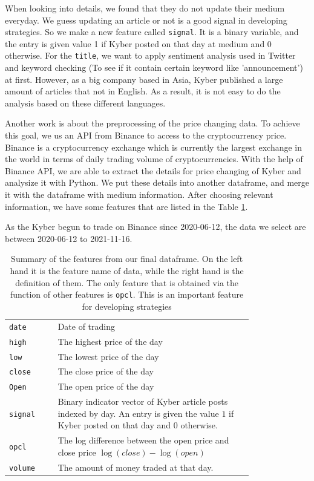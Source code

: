 \documentclass[twoside]{report}
\newcommand{\code}{\texttt}
\begin{document}
\begin{spacing}{1}
When looking into details, we found that they do not update their medium everyday. We guess updating an article or not is a good signal in developing strategies. So we make a new feature called \code{signal}. It is a binary variable, and the entry is given value 1 if Kyber posted on that day at medium and 0 otherwise.  For the \code{title}, we want to apply sentiment analysis used in Twitter and keyword checking (To see if it contain certain keyword like 'announcement') at first. However, as a big company based in Asia, Kyber published a large amount of articles that not in English. As a result, it is not easy to do the analysis based on these different languages.  




Another work is about the preprocessing of the price changing data. To achieve this goal, we us an API from Binance to access to the cryptocurrency price. Binance is a cryptocurrency exchange which is currently the largest exchange in the world in terms of daily trading volume of cryptocurrencies. With the help of Binance API, we are able to extract the details for price changing of Kyber and analysize it with Python. We put these details into another dataframe, and merge it with the dataframe with medium information. After choosing relevant information, we have some features that are listed in the Table \ref{tab:feature}. 

As the Kyber begun to trade on Binance since 2020-06-12, the data we select are between 2020-06-12 to 2021-11-16.


\begin{table}[!htp]
    \centering
    \begin{tabular}{|l|p{0.8\linewidth}|}
        \hline
        \code{date}  & Date of trading \\
        \code{high} & The highest price of the day\\
       \code{low}& The lowest price of the day\\
       \code{close} & The close price of the day\\
       \code{Open}& The open price of the day\\
         \code{signal} & Binary indicator vector of Kyber article posts indexed by day. An entry is given the value $1$ if Kyber posted on that day and $0$ otherwise.\\
         \code{opcl}  & The log difference between the open price and close price \code{$\log(close)-\log(open)$} \\
        \code{volume} & The amount of money traded at that day.\\ \hline
    \end{tabular}\vspace{2mm}
    \caption{Summary of the features from our final dataframe. On the left hand it is the feature name of data, while the right hand is the definition of them. The only feature that is obtained via the function of other features is \code{opcl}. This is an important feature for developing strategies }
    \label{tab:feature}
\end{table}



\end{spacing}
\end{document}
